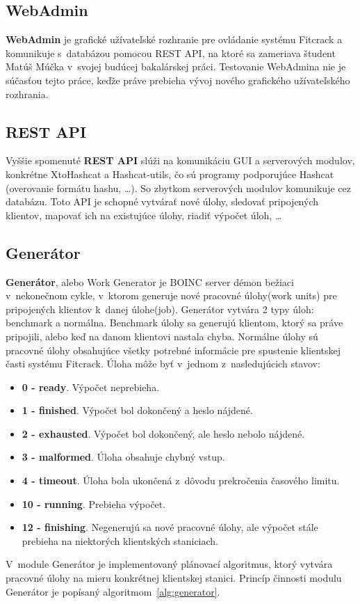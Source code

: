 \subsection{WebAdmin}
\label{webadmin}
\textbf{WebAdmin} je grafické užívateľské rozhranie pre ovládanie systému Fitcrack a komunikuje s~databázou pomocou REST API, na ktoré sa zameriava študent Matúš Múčka v~svojej budúcej bakalárskej práci.
Testovanie WebAdmina nie je súčasťou tejto práce, keďže práve prebieha vývoj nového grafického užívateľského rozhrania.

\subsection{REST API}
\label{API}
Vyššie spomenuté \textbf{REST API} slúži na komunikáciu GUI a serverových modulov, konkrétne XtoHashcat a Hashcat-utils, čo sú programy podporujúce Hashcat (overovanie formátu hashu, …).
So zbytkom serverových modulov komunikuje cez databázu.
Toto API je schopné vytvárať nové úlohy, sledovať pripojených klientov, mapovať ich na existujúce úlohy, riadiť výpočet úloh, …

\subsection{Generátor}
\label{generator}
\textbf{Generátor}, alebo Work Generator je BOINC server démon bežiaci v~nekonečnom cykle, v~ktorom generuje nové pracovné úlohy(work units) pre pripojených klientov k~danej úlohe(job).
Generátor vytvára 2 typy úloh: benchmark a normálna.
Benchmark úlohy sa generujú klientom, ktorý sa práve pripojili, alebo keď na danom klientovi nastala chyba.
Normálne úlohy sú pracovné úlohy obsahujúce všetky potrebné informácie pre spustenie klientskej časti systému Fitcrack.
Úloha môže byť v~jednom z~nasledujúcich stavov:
\begin{itemize}
	\item \textbf{0 - ready}. Výpočet neprebieha.
	\item \textbf{1 - finished}. Výpočet bol dokončený a heslo nájdené.
	\item \textbf{2 - exhausted}. Výpočet bol dokončený, ale heslo nebolo nájdené.
	\item \textbf{3 - malformed}. Úloha obsahuje chybný vstup.
	\item \textbf{4 - timeout}. Úloha bola ukončená z~dôvodu prekročenia časového limitu.
	\item \textbf{10 - running}. Prebieha výpočet.
	\item \textbf{12 - finishing}. Negenerujú sa nové pracovné úlohy, ale výpočet stále prebieha na niektorých klientských staniciach.
\end{itemize}
V~module Generátor je implementovaný plánovací algoritmus, ktorý vytvára pracovné úlohy na mieru konkrétnej klientskej stanici.
Princíp činnosti modulu Generátor je popísaný algoritmom~\ref{alg:generator}.

